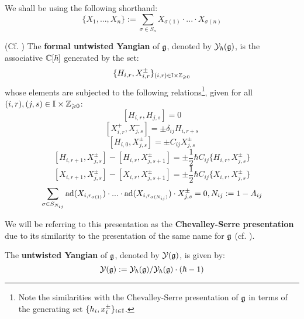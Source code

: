         \begin{convention}
            We shall be using the following shorthand:
                $$\{ X_1, ..., X_n \} := \sum_{\sigma \in S_n} X_{\sigma(1)} \cdot ... \cdot X_{\sigma(n)}$$
        \end{convention}
        \begin{definition} \label{def: formal_untwisted_yangians}
            (Cf. \cite[Definition 2.1]{guay_nakajima_wendlandt_affine_yangian_coproduct}) The \textbf{formal untwisted Yangian} of $\mathfrak{g}$, denoted by $\mathcal{Y}_{\hbar}(\mathfrak{g})$, is the associative $\mathbb{C}[\hbar]$ generated by the set:
                $$\{ H_{i, r}, X_{i, r}^{\pm} \}_{(i, r) \in \simpleroots \x \Z_{\geq 0}}$$
            whose elements are subjected to the following relations\footnote{Note the similarities with the Chevalley-Serre presentation of $\mathfrak{g}$ in terms of the generating set $\{ h_i, x_i^{\pm} \}_{i \in \mathbb{I}}$.}, given for all $(i, r), (j, s) \in \simpleroots \x \Z_{\geq 0}$:
                $$[ H_{i, r}, H_{j, s} ] = 0$$
                $$[ X_{i, r}^+, X_{j, s}^- ] = \pm \delta_{ij} H_{i, r + s}$$
                $$[ H_{i, 0}, X_{j, s}^{\pm} ] = \pm C_{ij} X_{j, s}^{\pm}$$
                $$[ H_{i, r + 1}, X_{j, s}^{\pm} ] - [ H_{i, r}, X_{j, s + 1}^{\pm} ] = \pm \frac12 \hbar C_{ij} \{H_{i, r}, X_{j, s}^{\pm}\}$$
                $$[ X_{i, r + 1}, X_{j, s}^{\pm} ] - [ X_{i, r}, X_{j, s + 1}^{\pm} ] = \pm \frac12 \hbar C_{ij} \{X_{i, r}, X_{j, s}^{\pm}\}$$
                $$\sum_{\sigma \in S_{N_{ij}}} \mathrm{ad}(X_{i, r_{\sigma(1)}}) \cdot ... \cdot \mathrm{ad}(X_{i, r_{\sigma(N_{ij})}}) \cdot X_{j, s}^{\pm} = 0, N_{ij} := 1 - A_{ij}$$
                
            We will be referring to this presentation as the \textbf{Chevalley-Serre presentation} due to its similarity to the presentation of the same name for $\mathfrak{g}$ (cf. \cite[Section 8]{humphreys_lie_algebras}). 
        \end{definition}
        \begin{definition} \label{def: untwisted_yangians}
            The \textbf{untwisted Yangian} of $\mathfrak{g}$, denoted by $\mathcal{Y}(\mathfrak{g})$, is given by:
                $$\mathcal{Y}(\mathfrak{g}) := \mathcal{Y}_{\hbar}(\mathfrak{g})/\mathcal{Y}_{\hbar}(\mathfrak{g}) \cdot (\hbar - 1)$$
        \end{definition}
